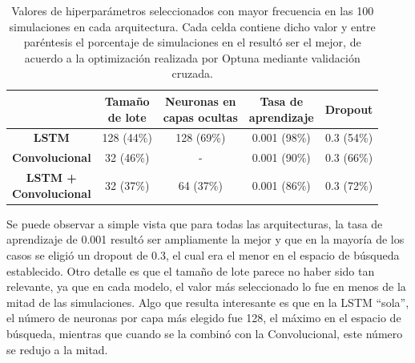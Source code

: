\documentclass[../../main.tex]{subfiles}
\begin{document}
\begin{table}[H]
    \centering
    \renewcommand{\arraystretch}{1.2}
    \begin{tabular}{|c|c|c|c|c|}
        \hline
            & \makecell{\textbf{Tamaño}\\\textbf{de lote}}
            & \makecell{\textbf{Neuronas en}\\\textbf{capas ocultas}}
            & \makecell{\textbf{Tasa de}\\\textbf{aprendizaje}}
            & \textbf{Dropout} \\ \hline\hline
        \textbf{LSTM}
            & 128 (44\%) & 128 (69\%) & 0.001 (98\%) & 0.3 (54\%) \\ \hline
        \textbf{Convolucional}
            & 32 (46\%)  & -          & 0.001 (90\%) & 0.3 (66\%) \\ \hline
        \makecell{\textbf{LSTM +}\\\textbf{Convolucional}}
            & 32 (37\%)  & 64 (37\%)  & 0.001 (86\%) & 0.3 (72\%) \\
        \hline
    \end{tabular}
    \caption{Valores de hiperparámetros seleccionados con mayor frecuencia en las 100
    simulaciones en cada arquitectura. Cada celda contiene dicho valor y entre paréntesis
    el porcentaje de simulaciones en el resultó ser el mejor, de acuerdo a la optimización
    realizada por Optuna mediante validación cruzada.}
    \label{tab:hyperparams_exp1}
\end{table}

Se puede observar a simple vista que para todas las arquitecturas, la tasa de aprendizaje
de 0.001 resultó ser ampliamente la mejor y que en la mayoría de los casos se eligió un
dropout de 0.3, el cual era el menor en el espacio de búsqueda establecido. Otro detalle
es que el tamaño de lote parece no haber sido tan relevante, ya que en cada modelo, el
valor más seleccionado lo fue en menos de la mitad de las simulaciones. Algo que resulta
interesante es que en la LSTM ``sola'', el número de neuronas por capa más elegido fue
128, el máximo en el espacio de búsqueda, mientras que cuando se la combinó con la
Convolucional, este número se redujo a la mitad.
\end{document}
